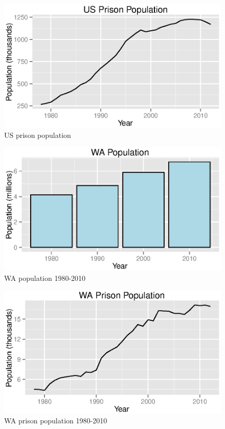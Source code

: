 \documentclass{exam}
\begin{document}
  \begin{figure}[H]
    \centering
    \includegraphics[scale = 0.9]{figures/us_prison_population.eps}
    \caption{US prison population}
  \end{figure}

  \begin{figure}[H]
    \centering
    \includegraphics[scale = 0.9]{figures/wa_population.eps}
    \caption{WA population 1980-2010}
  \end{figure}

  \begin{figure}[H]
    \centering
    \includegraphics[scale = 0.9]{figures/wa_prison_population.eps}
    \caption{WA prison population 1980-2010}
  \end{figure}
\end{document}
